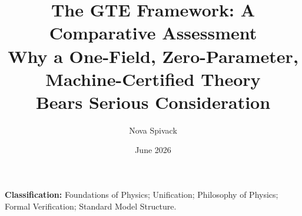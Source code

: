 \documentclass[11pt]{article}
\begin{document}
\title{\textbf{The GTE Framework: A Comparative Assessment}\\[0.35em]
\large\normalfont Why a One-Field, Zero-Parameter, Machine-Certified Theory\\
Bears Serious Consideration}

\author{Nova Spivack}
\date{June 2026}
\maketitle

\NovaZenodoAfterTitle

\noindent\textbf{Classification:} Foundations of Physics; Unification; Philosophy of
Physics; Formal Verification; Standard Model Structure.

\end{document}
